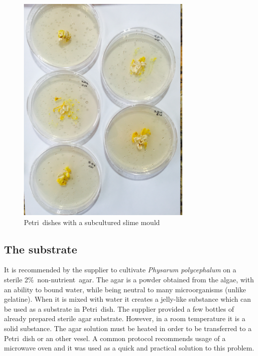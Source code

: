 \begin{figure}
  \centering

  \includegraphics[width=0.75\textwidth]{figures/physarum/IMG_1175.jpg}

  \caption{Petri~dishes with a subcultured slime mould}
  \label{figure:p_multiple_petri}
\end{figure}


\subsection*{The substrate}

It is recommended by the supplier to cultivate \textit{Physarum polycephalum} on a sterile 2\%~non-nutrient~agar. The agar is a powder obtained from the algae, with an ability to bound water, while being neutral to many microorganisms (unlike gelatine). When it is mixed with water it creates a jelly-like substance which can be used as a substrate in Petri~dish. The supplier provided a few bottles of already prepared sterile agar substrate. However, in a room temperature it is a solid substance. The agar solution must be heated in order to be transferred to a Petri~dish or an other vesel. A common protocol recommends usage of a microwave oven \cite{hanson1978microwave} and it was used as a quick and practical solution to this problem.

